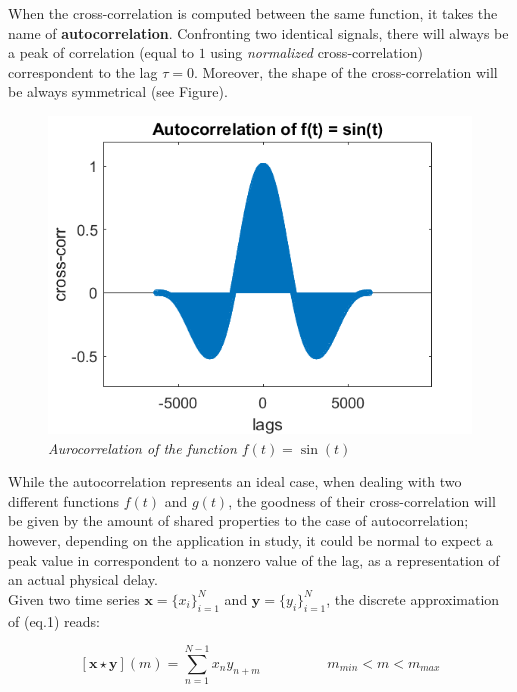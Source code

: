 \documentclass[a4paper]{article}
\begin{document}
When the cross-correlation is computed between the same function, it takes the name of \textbf{autocorrelation}. Confronting two identical signals, there will always be a peak of correlation (equal to $1$ using \textit{normalized} cross-correlation) correspondent to the lag $\tau = 0$. Moreover, the shape of the cross-correlation will be always symmetrical (see Figure).

\begin{figure}[H]
	\begin{center}
		\includegraphics[scale=.75]{autocorr.png} 
	\end{center} 
	\caption{\textit{Aurocorrelation of the function $ f(t) = \sin(t) $}}
	
\end{figure}


While the autocorrelation represents an ideal case, when dealing with two different functions $f(t)$ and $g(t)$, the goodness of their cross-correlation will be given by the amount of shared properties to the case of autocorrelation; however, depending on the application in study, it could be normal to expect a peak value in correspondent to a nonzero value of the lag, as a representation of an actual physical delay.
\\

Given two time series $ \textbf{x} = \{x_i\}_{i=1}^N$ and  $\textbf{y} = \{y_i\}_{i=1}^N$, the discrete approximation of (eq.1) reads:


$$ [\textbf{x} \star \textbf{y}] (m) =  \sum_{n=1}^{N-1} x_n y_{n+m} \hspace{2cm} m_{min} < m < m_{max} $$
\end{document}
